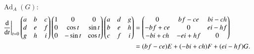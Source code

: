 \documentclass[a4paper, 12pt]{article}
\theoremstyle{Mydefinition}
\theoremstyle{Mytheorem}
\DeclareMathOperator{\Ad}{Ad}
\begin{document}
\begin{enumerate}
$\Ad_A(G)$:
\begin{equation*}
\begin{split}
    \left.\dv{t}\right|_{t=0}\begin{pmatrix}
        a & b & c\\
        d & e & f\\
        g & h & i
    \end{pmatrix}
    \begin{pmatrix}
        1 & 0 & 0\\
        0 & \cos t & \sin t\\
        0 & -\sin t & \cos t
    \end{pmatrix}
    \begin{pmatrix}
        a & d & g\\
        b & e & h\\
        c & f & i
    \end{pmatrix}&=\begin{pmatrix}
        0 & bf-ce & bi-ch\\
        -bf+ce & 0 & ei-hf\\
        -bi+ch & -ei+hf & 0
    \end{pmatrix}\\
    &=(bf-ce)E+(-bi+ch)F+(ei-hf)G.
\end{split}
\end{equation*}


\end{enumerate}
\end{document}
